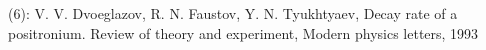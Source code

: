 \documentclass[preview]{standalone}
\begin{document}
\begin{center}
(6): V. V. Dvoeglazov, R. N. Faustov, Y. N. Tyukhtyaev, Decay rate of a positronium. Review of theory and experiment, Modern physics letters, 1993
\end{center}
\end{document}
